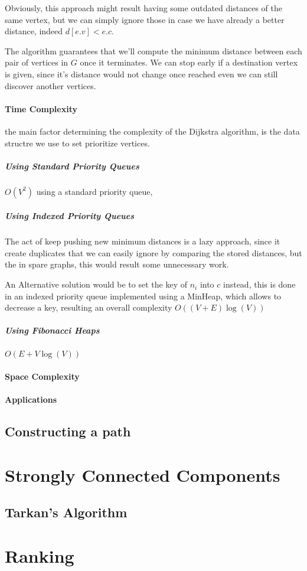 \documentclass[12pt]{article}
\begin{document}
Obviously, this approach might result having some outdated distances of the same vertex, but we can simply ignore those in case we have already a better distance, indeed  $d[e.v] < e.c$.

The algorithm guarantees that we'll compute the minimum distance between each pair of vertices in $G$ once it terminates. We can stop early if a destination vertex is given, since it's distance would not change once reached even we can still discover another vertices.

\paragraph{Time Complexity}

the main factor determining the complexity of the Dijkstra algorithm, is the data structre we use to set prioritize vertices.

\subparagraph{Using Standard Priority Queues}
$O(V^2)$ using a standard priority queue,

\subparagraph{Using Indexed Priority Queues} The act of keep pushing new minimum distances is a lazy approach, since it create duplicates that we can easily ignore by comparing the stored distances, but the in spare graphs, this would result some unnecessary work.

An Alternative solution would be to set the key of $n_i$ into $c$ instead, this is done in an indexed priority queue implemented using a MinHeap, which allows to decrease a key, resulting an overall complexity $O((V+E)\log(V))$

\subparagraph{Using Fibonacci Heaps}

$O(E + V\log(V))$
\paragraph{Space Complexity}
\paragraph{Applications}

\subsection{Constructing a path}

\section{Strongly Connected Components}
\subsection{Tarkan's Algorithm}

\section{Ranking}
\end{document}
